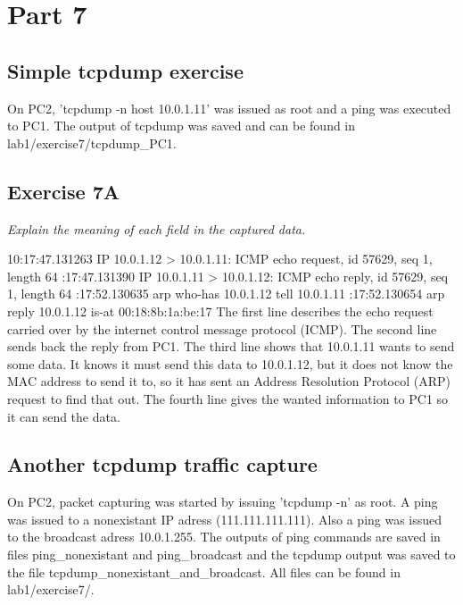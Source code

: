 \documentclass[a4paper, 11pt]{article}
\begin{document}
\section{Part 7}

\subsection{Simple tcpdump exercise}

On PC2, 'tcpdump -n host 10.0.1.11' was issued as root and a ping was executed to PC1. The output of tcpdump was saved and can
be found in lab1/exercise7/tcpdump\_PC1.

\subsection{Exercise 7A}

\emph{ Explain the meaning of each field in the captured data.}

10:17:47.131263 IP 10.0.1.12 > 10.0.1.11: ICMP echo request, id 57629, seq 1, length 64 :17:47.131390 IP 10.0.1.11 > 10.0.1.12: ICMP echo reply, id 57629, seq 1, length 64 :17:52.130635 arp who-has 10.0.1.12 tell 10.0.1.11 :17:52.130654 arp reply 10.0.1.12 is-at 00:18:8b:1a:be:17 \newline
\newline
The first line describes the echo request carried over by the internet control message protocol (ICMP). \newline
The second line sends back the reply from PC1. \newline
The third line shows that 10.0.1.11 wants to send some data. It knows it must send this data to 10.0.1.12, but it does not know
the MAC address to send it to, so it has sent an Address Resolution Protocol (ARP) request to find that out. \newline
The fourth line gives the wanted information to PC1 so it can send the data.

\subsection {Another tcpdump traffic capture}

On PC2, packet capturing was started by issuing 'tcpdump -n' as root. A ping was issued to a nonexistant IP adress (111.111.111.111).
Also a ping was issued to the broadcast adress 10.0.1.255. The outputs of ping commands are saved in files ping\_nonexistant and ping\_broadcast 
and the tcpdump output was saved to the file tcpdump\_nonexistant\_and\_broadcast. All files can be found in lab1/exercise7/.
\end{document}
